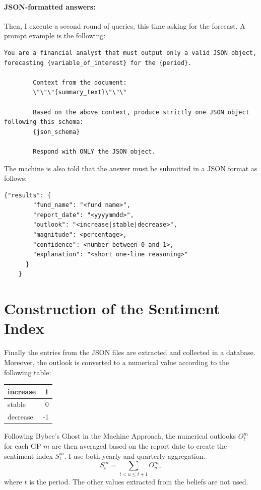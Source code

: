 \paragraph{JSON-formatted answers:} Then, I execute a second round of queries, this time asking for the forecast.
A prompt example is the following:

\begin{lstlisting}[style= cmd,label={lst:GP_prompt_json}]
        You are a financial analyst that must output only a valid JSON object, forecasting {variable_of_interest} for the {period}.

        Context from the document:
        \"\"\"{summary_text}\"\"\"

        Based on the above context, produce strictly one JSON object following this schema:
        {json_schema}

        Respond with ONLY the JSON object.
\end{lstlisting}

The machine is also told that the answer must be submitted in a JSON format as follows:

\begin{lstlisting}[style=json,label={lst:json_schema}]
    {"results": {
        "fund_name": "<fund name>",
        "report_date": "<yyyymmdd>",
        "outlook": "<increase|stable|decrease>",
        "magnitude": <percentage>,
        "confidence": <number between 0 and 1>,
        "explanation": "<short one-line reasoning>"
      }
    }
\end{lstlisting}

\section{Construction of the Sentiment Index}\label{sec:construction-of-the-sentiment-index}
Finally the entries from the JSON files are extracted and collected in a database.
Moreover, the outlook is converted to a numerical value according to the following table:
\begin{center}
    \begin{tabular}{l|r}
        increase & 1 \\ \hline
        stable & 0 \\ \hline
        decrease & -1 \\
    \end{tabular}
\end{center}

Following Bybee's Ghost in the Machine Approach, the numerical outlooks $O^m_{t}$ for each GP $m$ are then averaged based on the report date to create the sentiment index $S^m_t$.
I use both yearly and quarterly aggregation.
\begin{equation}
    S_t^m = \sum_{t < u \leq t+1} O_u^m,\label{eq:sentiment}
\end{equation}
where $t$ is the period.
The other values extracted from the beliefs are not used.


